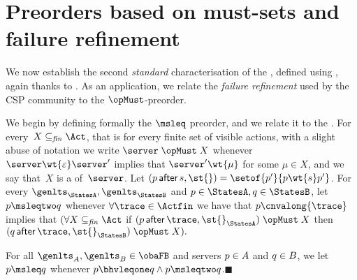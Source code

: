 \section{Preorders based on must-sets and failure refinement}

We now establish the second \emph{standard} characterisation of the \mustpreorder, defined
using \MustSets, again thanks to  .
%
As an application, we relate the \emph{failure refinement} used by the CSP
community to the $\opMust$-preorder.


We begin by defining formally the $\msleq$ preorder, and we relate it to the \mustpreorder.
%
\renewcommand{\after}[3]{ (#1 \, \mathsf{after} \,  #2, #3) }
%
For every~$X \subseteq_{\mathit{fin}} \Act$, that is for every finite
set of visible actions, with a slight abuse of notation we write
$\server \mathrel{\opMust} X$ whenever
$\server \wt{ \varepsilon } \server'$ implies that
$\server' \wt{ \mu }$ for some $\mu \in X$, and we say that~$X$ is a
\MustSet of~$\server$.  Let
$\after{ \serverA }{ s }{ \st{} } = \setof{ \serverA' }{ \serverA
  \wt{s} \serverA' }$.  For every $\genlts_\StatesA, \genlts_\StatesB$
and $\serverA \in \StatesA, \serverB \in \StatesB$, let
$\serverA \msleqtwo \serverB$ whenever $\forall \trace \in \Actfin$ we
have that $\serverA \cnvalong{ \trace }$ implies that
$(\forall X \subseteq_{\mathit{fin}} \Act$ if
$\after{\serverA}{\trace}{ \st{}_\StatesA } \mathrel{\opMust} X$ then
$\after{\serverB}{\trace}{ \st{}_\StatesB } \mathrel{\opMust} X).$



\begin{definition}
  \label{def:denicola-char}
  For all $\genlts_A, \genlts_B \in \obaFB$ and servers $p
  \in A$ and $q \in B$, we let $\serverA \msleq \serverB$ whenever
  $\serverA \bhvleqone \serverB \wedge
  \serverA \msleqtwo \serverB$.\hfill$\blacksquare$
\end{definition}


